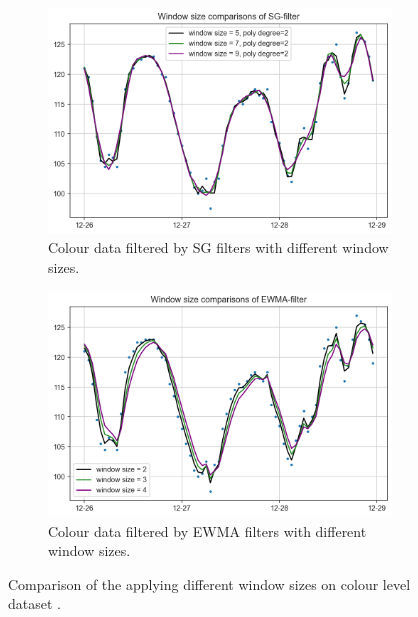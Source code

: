 \begin{figure}[!ht]
  \centering
  \begin{subfigure}{0.7\textwidth}
    \includegraphics[width=\linewidth]{imgs/pre-processing/sg-filter-colour.png}
    \caption{Colour data filtered by SG filters with different window sizes.} \label{fig:smoothed-sg-colour}
  \end{subfigure}%
  \hspace{2em}%
  \begin{subfigure}{0.7\textwidth}
    \includegraphics[width=\linewidth]{imgs/pre-processing/ewma-filter-colour.png}
    \caption{Colour data filtered by EWMA filters with different window sizes.} \label{fig:smoothed-ew-colour}
  \end{subfigure}%
\caption{Comparison of the applying different window sizes on colour level dataset .} \label{fig:smoothed-colour}
\end{figure}

